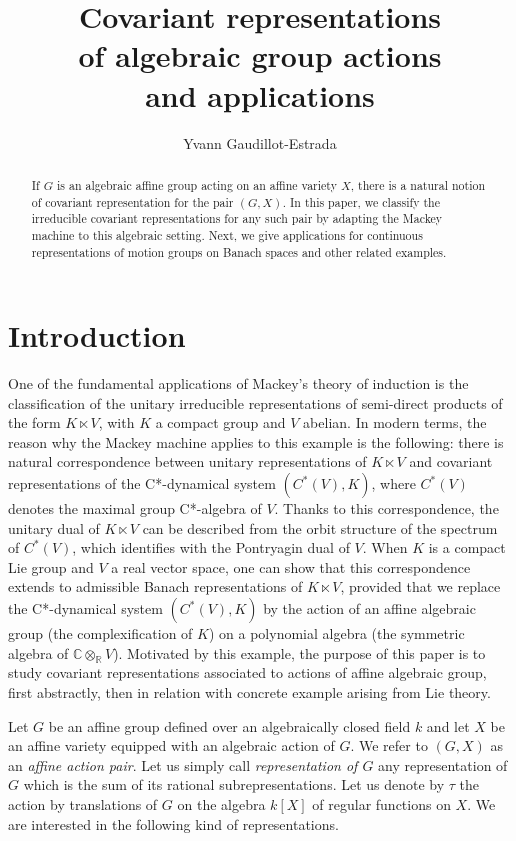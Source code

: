 \documentclass{amsart}
\title[Covariant representations of algebraic actions]{Covariant representations \\ of algebraic group actions \\ and applications}
\author{Yvann Gaudillot-Estrada}
\theoremstyle{definition}
\begin{document}
    

\begin{abstract}
    If $G$ is an algebraic affine group acting on an affine variety $X$, there is a natural notion of covariant representation for the pair $(G,X)$. In this paper, we classify the irreducible covariant representations for any such pair by adapting the Mackey machine to this algebraic setting. Next, we give applications for continuous representations of motion groups on Banach spaces and other related examples.
\end{abstract}

\maketitle

\section*{Introduction}

One of the fundamental applications of Mackey's theory of induction \cite{Mackey} is the classification of the unitary irreducible representations of semi-direct products of the form $K \ltimes V$, with $K$ a compact group and $V$ abelian. In modern terms, the reason why the Mackey machine applies to this example is the following: there is natural correspondence between unitary representations of $K \ltimes V$ and covariant representations \cites{Dana, Raeburn} of the C*-dynamical system $(C^*(V), K)$, where $C^*(V)$ denotes the maximal group C*-algebra of $V$. Thanks to this correspondence, the unitary dual of $K \ltimes V$ can be described from the orbit structure of the spectrum of $C^*(V)$, which identifies with the Pontryagin dual of $V$. When $K$ is a compact Lie group and $V$ a real vector space, one can show that this correspondence extends to admissible Banach representations of $K \ltimes V$, provided that we replace the C*-dynamical system $(C^*(V), K)$ by the action of an affine algebraic group (the complexification of $K$) on a polynomial algebra (the symmetric algebra of $\mathbb{C} \otimes_\mathbb{R} V$). Motivated by this example, the purpose of this paper is to study covariant representations associated to actions of affine algebraic group, first abstractly, then in relation with concrete example arising from Lie theory.

Let $G$ be an affine group defined over an algebraically closed field $k$ and let $X$ be an affine variety equipped with an algebraic action of $G$. We refer to $(G,X)$ as an \textit{affine action pair}. Let us simply call \textit{representation of $G$} any representation of $G$ which is the sum of its rational subrepresentations. Let us denote by $\tau$ the action by translations of $G$ on the algebra $k[X]$ of regular functions on $X$. We are interested in the following kind of representations.
\end{document}
